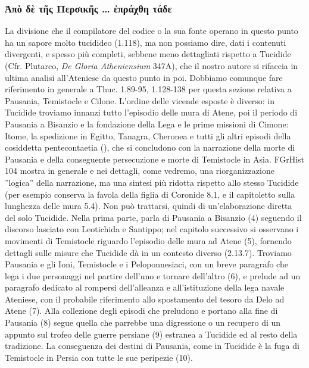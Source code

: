 {        \subsubsection{\textgreek{Ἀπὸ δὲ τῆς Περσικῆς … ἐπράχθη τάδε}}\label{bkm:RefHeading3610719231068}
        La divisione che il compilatore del codice o la sua fonte operano in questo punto ha un sapore molto tucidideo (1.118), ma non possiamo dire, dati i contenuti divergenti, e spesso più completi, sebbene meno dettagliati rispetto a Tucidide (Cfr. Plutarco, \emph{De Gloria Atheniensium} 347A), che il nostro autore si rifaccia in ultima analisi all'Ateniese da questo punto in poi. Dobbiamo comunque fare riferimento in generale a Thuc. 1.89-95, 1.128-138 per questa sezione relativa a Pausania, Temistocle e Cilone. L'ordine delle vicende esposte è diverso: in Tucidide troviamo innanzi tutto l'episodio delle mura di Atene, poi il periodo di Pausania  a Bisanzio e la fondazione della Lega e le prime missioni di Cimone: Itome, la spedizione in Egitto, Tanagra, Cheronea e tutti gli altri episodi della cosiddetta pentecontaetia (\cite[444s]{Meiggs1972}), che si concludono con la narrazione della morte di Pausania  e della conseguente persecuzione e morte di Temistocle in Asia. FGrHist 104 mostra in generale e nei dettagli, come vedremo, una riorganizzazione ''logica'' della narrazione, ma una sintesi più ridotta rispetto allo stesso Tucidide (per esempio conserva la favola della figlia di Coronide 8.1, e il capitoletto sulla lunghezza delle mura 5.4). Non può trattarsi, quindi di un'elaborazione diretta del solo Tucidide. Nella prima parte, parla di Pausania  a Bisanzio (4) seguendo il discorso lasciato con Leotichida e Santippo; nel capitolo successivo si osservano i movimenti di Temistocle riguardo l'episodio delle mura ad Atene (5), fornendo dettagli sulle misure che Tucidide dà in un contesto diverso (2.13.7). Troviamo Pausania  e gli Ioni, Temistocle e i Peloponnesiaci, con un breve paragrafo che lega i due personaggi nel partire dell'uno e tornare dell'altro (6), e prelude ad un paragrafo dedicato al rompersi dell'alleanza e all'istituzione della lega navale Ateniese, con il probabile riferimento allo spostamento del tesoro da Delo ad Atene (7). Alla collezione degli episodi che preludono e portano alla fine di Pausania  (8) segue quella che parrebbe una digressione o un recupero di un appunto sul trofeo delle guerre persiane (9) estranea a Tucidide ed al resto della tradizione. La conseguenza dei destini di Pausania, come in Tucidide è la fuga di Temistocle in Persia con tutte le sue peripezie (10). 
}
